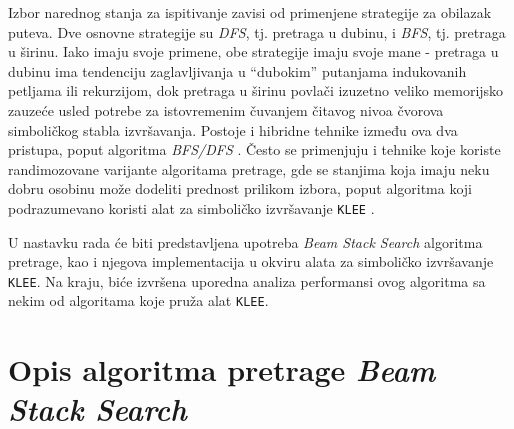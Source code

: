 \documentclass[a4paper]{article}
\begin{document}
Izbor narednog stanja za ispitivanje zavisi od primenjene strategije za obilazak puteva. Dve osnovne strategije su \textit{DFS}, tj. pretraga u dubinu, i \textit{BFS}, tj. pretraga u širinu. Iako imaju svoje primene, obe strategije imaju svoje mane - pretraga u dubinu ima tendenciju zaglavljivanja u \enquote{dubokim} putanjama indukovanih petljama ili rekurzijom, dok pretraga u širinu povlači izuzetno veliko memorijsko zauzeće usled potrebe za istovremenim čuvanjem čitavog nivoa čvorova simboličkog stabla izvršavanja. Postoje i hibridne tehnike između ova dva pristupa, poput algoritma \textit{BFS/DFS} \cite{BFS/DFS-StrahinjaStanojevic}. Često se primenjuju i tehnike koje koriste randimozovane varijante algoritama pretrage, gde se stanjima koja imaju neku dobru osobinu može dodeliti prednost prilikom izbora, poput algoritma koji podrazumevano koristi alat za simboličko izvršavanje \verb|KLEE| \cite{KLEE-paper-10.5555/1855741.1855756}.

U nastavku rada će biti predstavljena upotreba \textit{Beam Stack Search} algoritma pretrage, kao i njegova implementacija u okviru alata za simboličko izvršavanje \verb|KLEE|. Na kraju, biće izvršena uporedna analiza performansi ovog algoritma sa nekim od algoritama koje pruža alat \verb|KLEE|.

\section{Opis algoritma pretrage \textit{Beam Stack Search}}

\appendix


\end{document}
